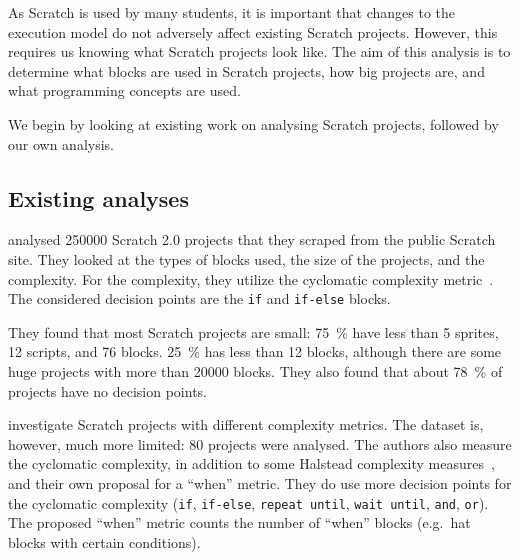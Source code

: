 \documentclass[../main]{subfiles}
\begin{document}
As Scratch is used by many students, it is important that changes to the execution model do not adversely affect existing Scratch projects.
However, this requires us knowing what Scratch projects look like.
The aim of this analysis is to determine what blocks are used in Scratch projects, how big projects are, and what programming concepts are used.

We begin by looking at existing work on analysing Scratch projects, followed by our own analysis.

\subsection{Existing analyses}\label{subsec:existing-analyses}

\Textcite{aivaloglouHowKidsCode2016} analysed \num{250000} Scratch 2.0 projects that they scraped from the public Scratch site.
They looked at the types of blocks used, the size of the projects, and the complexity.
For the complexity, they utilize the cyclomatic complexity metric~\autocite{mccabeComplexityMeasure1976}.
The considered decision points are the \texttt{if} and \texttt{if-else} blocks.

They found that most Scratch projects are small: \qty{75}{\percent} have less than 5 sprites, 12 scripts, and 76 blocks.
\qty{25}{\percent} has less than 12 blocks, although there are some huge projects with more than \num{20000} blocks.
They also found that about \qty{78}{\percent} of projects have no decision points.

\Textcite{fronzaApproachEvaluateComplexity2020} investigate Scratch projects with different complexity metrics.
The dataset is, however, much more limited: 80 projects were analysed.
The authors also measure the cyclomatic complexity, in addition to some Halstead complexity measures~\autocite{halsteadElementsSoftwareScience1977}, and their own proposal for a ``when'' metric.
They do use more decision points for the cyclomatic complexity (\texttt{if}, \texttt{if-else}, \texttt{repeat until}, \texttt{wait until}, \texttt{and}, \texttt{or}).
The proposed ``when'' metric counts the number of ``when'' blocks (e.g.\ hat blocks with certain conditions).
\end{document}
